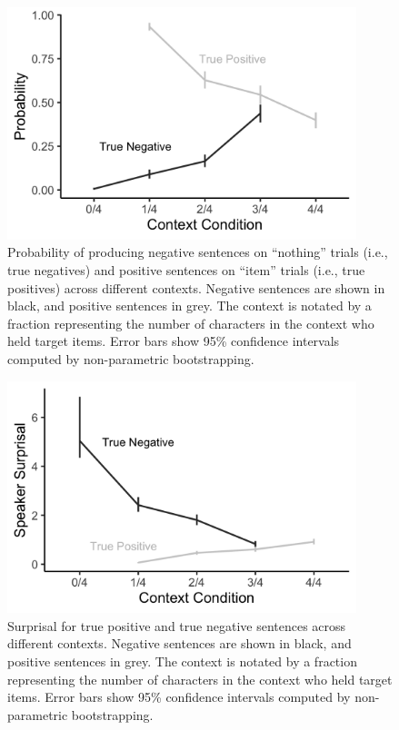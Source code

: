 \documentclass[man, floatsintext, noapacite]{apa6}
\begin{document}
\begin{figure}[t]
\begin{center} 
\includegraphics[width=4in]{figures/experiment2/speaker_probs.png}
\caption{\label{fig:exp2_speakerprobs} Probability of producing negative sentences on ``nothing'' trials (i.e., true negatives) and positive sentences on ``item'' trials (i.e., true positives) across different contexts. Negative sentences are shown in black, and positive sentences in grey.  The context is notated by a fraction representing the number of characters in the context who held target items. Error bars show 95\% confidence intervals computed by non-parametric bootstrapping.  }
\end{center} 
\end{figure}

\begin{figure}[t]
\begin{center} 
\includegraphics[width=4in]{figures/experiment2/speaker_surprisal.png}
\caption{\label{fig:exp2_speakersurprise} Surprisal for true positive and true negative sentences across different contexts. Negative sentences are shown in black, and positive sentences in grey.  The context is notated by a fraction representing the number of characters in the context who held target items. Error bars show 95\% confidence intervals computed by non-parametric bootstrapping.  }
\end{center} 
\end{figure}
\end{document}
